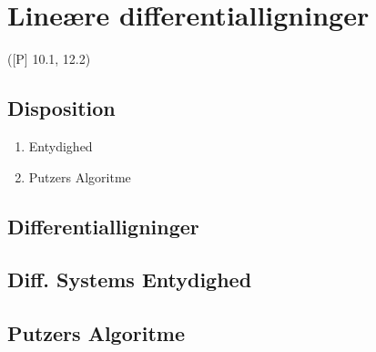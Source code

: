 \newpage
\chapter{Lineære differentialligninger}
([P] 10.1, 12.2)

\section*{Disposition}
\begin{enumerate}
	\item Entydighed
	\item Putzers Algoritme
\end{enumerate}

\section{Differentialligninger}


\section{Diff. Systems Entydighed}


\section{Putzers Algoritme}


